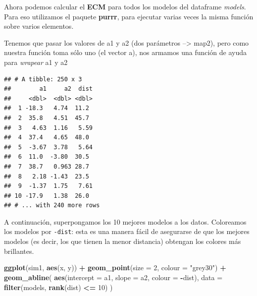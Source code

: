\documentclass[]{book}
\newenvironment{Shaded}{\begin{snugshade}}{\end{snugshade}}
\newcommand{\ControlFlowTok}[1]{\textcolor[rgb]{0.13,0.29,0.53}{\textbf{#1}}}
\newcommand{\DataTypeTok}[1]{\textcolor[rgb]{0.13,0.29,0.53}{#1}}
\newcommand{\DecValTok}[1]{\textcolor[rgb]{0.00,0.00,0.81}{#1}}
\newcommand{\KeywordTok}[1]{\textcolor[rgb]{0.13,0.29,0.53}{\textbf{#1}}}
\newcommand{\NormalTok}[1]{#1}
\newcommand{\OperatorTok}[1]{\textcolor[rgb]{0.81,0.36,0.00}{\textbf{#1}}}
\newcommand{\StringTok}[1]{\textcolor[rgb]{0.31,0.60,0.02}{#1}}
\begin{document}
Ahora podemos calcular el \textbf{ECM} para todos los modelos del dataframe \emph{models}. Para eso utilizamos el paquete \textbf{purrr}, para ejecutar varias veces la misma función sobre varios elementos.

Tenemos que pasar los valores de a1 y a2 (dos parámetros --\textgreater{} map2), pero como nuestra función toma sólo uno (el vector a), nos armamos una función de ayuda para \emph{wrapear} a1 y a2

\begin{Shaded}
\end{Shaded}

\begin{verbatim}
## # A tibble: 250 x 3
##        a1     a2  dist
##     <dbl>  <dbl> <dbl>
##  1 -18.3   4.74  11.2 
##  2  35.8   4.51  45.7 
##  3   4.63  1.16   5.59
##  4  37.4   4.65  48.0 
##  5  -3.67  3.78   5.64
##  6  11.0  -3.80  30.5 
##  7  38.7   0.963 28.7 
##  8   2.18 -1.43  23.5 
##  9  -1.37  1.75   7.61
## 10 -17.9   1.38  26.0 
## # ... with 240 more rows
\end{verbatim}

A continuación, superpongamos los 10 mejores modelos a los datos. Coloreamos los modelos por \texttt{-dist}: esta es una manera fácil de asegurarse de que los mejores modelos (es decir, los que tienen la menor distancia) obtengan los colores más brillantes.

\begin{Shaded}
\begin{Highlighting}[]
\KeywordTok{ggplot}\NormalTok{(sim1, }\KeywordTok{aes}\NormalTok{(x, y)) }\OperatorTok{+}\StringTok{ }
\StringTok{  }\KeywordTok{geom_point}\NormalTok{(}\DataTypeTok{size =} \DecValTok{2}\NormalTok{, }\DataTypeTok{colour =} \StringTok{"grey30"}\NormalTok{) }\OperatorTok{+}\StringTok{ }
\StringTok{  }\KeywordTok{geom_abline}\NormalTok{(}
    \KeywordTok{aes}\NormalTok{(}\DataTypeTok{intercept =}\NormalTok{ a1, }\DataTypeTok{slope =}\NormalTok{ a2, }\DataTypeTok{colour =} \OperatorTok{-}\NormalTok{dist), }
    \DataTypeTok{data =} \KeywordTok{filter}\NormalTok{(models, }\KeywordTok{rank}\NormalTok{(dist) }\OperatorTok{<=}\StringTok{ }\DecValTok{10}\NormalTok{)}
\NormalTok{  )}
\end{Highlighting}
\end{Shaded}
\end{document}
